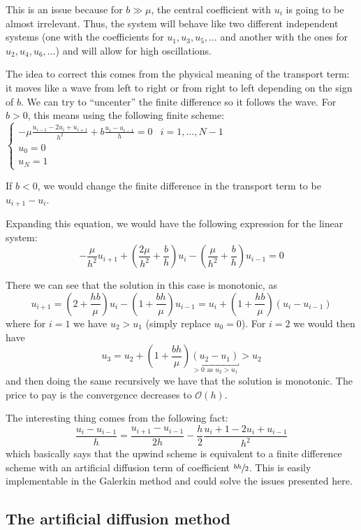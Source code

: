 This is an issue because for $b \gg μ$, the central coefficient with $u_i$ is going to be almost irrelevant. Thus, the system will behave like two different independent systems (one with the coefficients for $u_1, u_3, u_5, \dotsc$ and another with the ones for $u_2, u_4, u_6, \dotsc$) and will allow for high oscillations.

The idea to correct this comes from the physical meaning of the transport term: it moves like a wave from left to right or from right to left depending on the sign of $b$. We can try to ``uncenter'' the finite difference so it follows the wave. For $b > 0$, this means using the following finite scheme: \( \label{eq:ODE:Upwinding} \begin{cases} - μ \frac{u_{i - 1} - 2u_i + u_{i + 1}}{h^2} + b \frac{u_{i} - u_{i-1}}{h} = 0& i = 1, \dotsc, N - 1 \\
u_0 = 0 \\
u_N = 1
\end{cases} \)

If $b < 0$, we would change the finite difference in the transport term to be $u_{i + 1} - u_i$.

Expanding this equation, we would have the following expression for the linear system: \[  -\frac{μ}{h^2} u_{i+ 1} + \left(\frac{2μ}{h^2} + \frac{b}{h}\right) u_i - \left(\frac{μ}{h^2} + \frac{b}{h}\right) u_{i-1} = 0\]

There we can see that the solution in this case is monotonic, as \[ u_{i+1} = \left(2 + \frac{hb}{μ}\right)u_{i} - \left(1 + \frac{bh}{μ}\right) u_{i - 1} = u_i + \left(1 + \frac{hb}{μ}\right)(u_i - u_{i-1}) \] where for $i = 1$ we have $u_{2} > u_1$ (simply replace $u_0 = 0$). For $i = 2$ we would then have \[ u_3 = u_2 + \left(1 + \frac{bh}{μ}\right)\underbracket{(u_2 - u_1)}_{> 0 \text{ as } u_2 > u_1} > u_2 \] and then doing the same recursively we have that the solution is monotonic. The price to pay is the convergence decreases to $\mathcal{O}(h)$.

The interesting thing comes from the following fact: \[ \frac{u_i - u_{i-1}}{h} = \frac{u_{i+1} - u_{i-1}}{2h} - \frac{h}{2} \frac{u_i+1 - 2u_i + u_{i-1}}{h^2} \] which basically says that the upwind scheme is equivalent to a finite difference scheme with an artificial diffusion term of coefficient $\sfrac{bh}{2}$. This is easily implementable in the Galerkin method and could solve the issues presented here.

\subsection{The artificial diffusion method}


